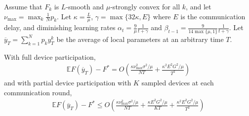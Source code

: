 \begin{theorem}
	Assume that $F_{k}$ is $L$-smooth and $\mu$-strongly convex for
	all $k$, and let $\nu_{\max}=\max_{k}\frac{1}{N}p_{k}$. Let $\kappa=\frac{L}{\mu}$,
	$\gamma=\max\{32\kappa,E\}$ where $E$ is the communication delay,
	and diminishing learning rates $\alpha_{t}=\frac{9}{\mu}\frac{1}{t+\gamma}$
	and $\beta_{t-1}=\frac{9}{14\max\{\mu,1\}}\frac{1}{t+\gamma}$. Let
	$\overline{y}_{T}=\sum_{k=1}^{N}p_{k}y_{T}^{k}$ be the average of
	local parameters at an arbitrary time $T$. 
	
	With full device participation, 
	\begin{align*}
	\mathbb{E}F(\overline{y}_{T})-F^{\ast}=O(\frac{\kappa\nu_{\max}^{2}\sigma^{2}/\mu}{NT}+\frac{\kappa^{2}E^{2}G^{2}/\mu}{T^{2}})
	\end{align*}
	and with partial device participation with $K$ sampled devices at
	each communication round, 
	\begin{align*}
	\mathbb{E}F(\overline{y}_{T})-F^{\ast}\leq O(\frac{\kappa\nu_{\max}^{2}\sigma^{2}/\mu}{NT}+\frac{\kappa E^{2}G^{2}/\mu}{KT}+\frac{\kappa^{2}E^{2}G^{2}/\mu}{T^{2}})
	\end{align*}
\end{theorem}
%
%
\textbf{}%
\begin{comment}
This implies that $E$ canot be chosen $O(T^{\beta})$ for any $\beta>0$
without degrading the performance. This should be checked in experiments,
whether with partial participation if the communication round is set
to scale with $T$, the convergence deteriorates. This is in constrast
with the full participation case, where $E=O(\sqrt{\frac{T}{N}})$
is allowed. \textbf{If we can confirm that full participation allows
linear speedup with $\nu=N\cdot\max_{k}p_{k}\approx1$ and $E=O(\sqrt{\frac{T}{N}})$,
whereas partial participation only allows $E=O(1)$, then this would
an interesting phenomenon that is not reported by previous studies!}

The convergence result implies that with fixed $E$, as long as \$N\$
satisfies \$E=O(\textbackslash sqrt\{T/N\})\$, there is linear speedup.
When \$N\$ exceeds an upper bound, however, linear speedup may fail
to happen, and \$T/N\$ may remain constant, i.e. the number of iterations
required for convergence may increase with \$N\$. 
\end{comment}

